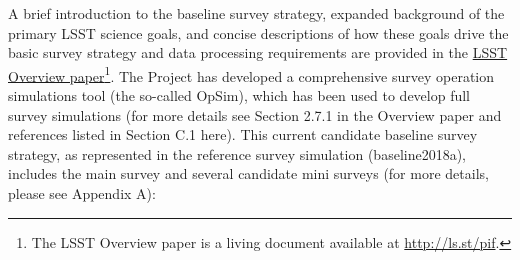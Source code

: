 \documentclass[DM,lsstdraft,toc,usenatbib]{lsstdoc}
\begin{document}
A brief introduction to the baseline survey strategy, expanded background of the primary LSST science 
goals, and concise descriptions of how these goals drive the basic survey strategy and data processing
requirements are provided in the \href{http://ls.st/pif}{LSST Overview paper}\footnote{The LSST Overview 
paper is a living document available at \href{http://ls.st/pif}{http://ls.st/pif}.}. The Project has developed
a comprehensive survey operation simulations tool (the so-called OpSim), which has been used to develop
full survey simulations (for more details see Section 2.7.1 in the Overview paper and references listed
in Section C.1 here). 
This current candidate baseline survey strategy, as represented in the reference survey simulation (baseline2018a), 
includes the main survey and several candidate mini surveys (for more details, please see Appendix A): 
\end{document}
